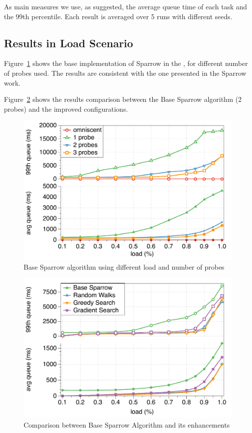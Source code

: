 \documentclass[conference]{IEEEtran}
\begin{document}
  As main measures we use, as suggested, the average queue time of each
  task and the 99th percentile. Each result is averaged over 5 runs with
  different seeds.

\subsection{Results in Load Scenario}

  Figure~\ref{fig:probes} shows the base implementation of Sparrow in the
  , for different number of probes used. The
  results are consistent with the one presented in the Sparrow work.

  Figure~\ref{fig:comparison} shows the results comparison between the Base
  Sparrow algorithm (2 probes) and the improved configurations.

  \begin{figure}
  \begin{center}
  \includegraphics[width=.5\textwidth]{figures/probes_new}
  \caption{Base Sparrow algorithm using different load and number of probes}
  \label{fig:probes}
  \end{center}
  \end{figure}

  \begin{figure}
  \begin{center}
  \includegraphics[width=.5\textwidth]{figures/comparison_new}
  \caption{Comparison between Base Sparrow Algorithm and its enhancements}
  \label{fig:comparison}
  \end{center}
  \end{figure}
\end{document}
